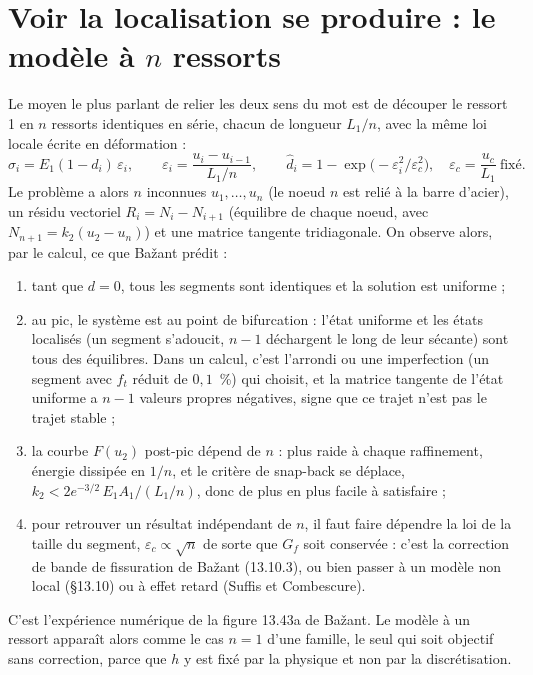 \documentclass[11pt,a4paper]{article}
\newcommand{\uc}{u_c}
\begin{document}
\section{Voir la localisation se produire : le modèle à $n$ ressorts}
Le moyen le plus parlant de relier les deux sens du mot est de découper le ressort 1 en $n$
ressorts identiques en série, chacun de longueur $L_1/n$, avec la même loi locale écrite en
déformation :
\begin{equation}
  \sigma_i = E_1(1-d_i)\,\varepsilon_i,\qquad \varepsilon_i = \frac{u_i - u_{i-1}}{L_1/n},\qquad
  \hat d_i = 1 - \exp\!\bigl(-\varepsilon_i^2/\varepsilon_c^2\bigr),\quad \varepsilon_c = \frac{\uc}{L_1}\ \text{fixé}.
\end{equation}
Le problème a alors $n$ inconnues $u_1,\ldots,u_n$ (le noeud $n$ est relié à la barre d'acier),
un résidu vectoriel $R_i = N_i - N_{i+1}$ (équilibre de chaque noeud, avec $N_{n+1} = k_2(u_2 - u_n)$)
et une matrice tangente tridiagonale. On observe alors, par le calcul, ce que Bažant prédit :
\begin{enumerate}[nosep]
  \item tant que $d = 0$, tous les segments sont identiques et la solution est uniforme ;
  \item au pic, le système est au point de bifurcation : l'état uniforme et les états
        localisés (un segment s'adoucit, $n-1$ déchargent le long de leur sécante) sont tous
        des équilibres. Dans un calcul, c'est l'arrondi ou une imperfection (un segment avec
        $f_t$ réduit de $0{,}1$~\%) qui choisit, et la matrice tangente de l'état uniforme a
        $n-1$ valeurs propres négatives, signe que ce trajet n'est pas le trajet stable ;
  \item la courbe $F(u_2)$ post-pic dépend de $n$ : plus raide à chaque raffinement, énergie
        dissipée en $1/n$, et le critère de snap-back se déplace,
        $k_2 < 2e^{-3/2}\,E_1A_1/(L_1/n)$, donc de plus en plus facile à satisfaire ;
  \item pour retrouver un résultat indépendant de $n$, il faut faire dépendre la loi de la
        taille du segment, $\varepsilon_c \propto \sqrt{n}$ de sorte que $G_f$ soit conservée : c'est
        la correction de bande de fissuration de Bažant (13.10.3), ou bien passer à un modèle
        non local (§13.10) ou à effet retard (Suffis et Combescure).
\end{enumerate}
C'est l'expérience numérique de la figure 13.43a de Bažant. Le modèle à un ressort apparaît
alors comme le cas $n = 1$ d'une famille, le seul qui soit objectif sans correction, parce
que $h$ y est fixé par la physique et non par la discrétisation.
\end{document}
